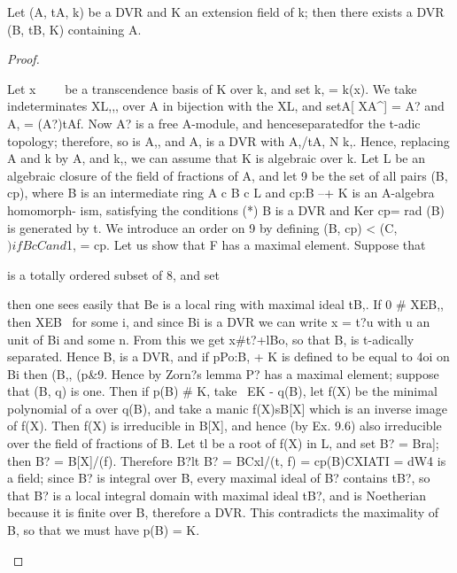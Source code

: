 \begin{theorem}[Theorem 29.1]\label{mcrt-auto-theorem-29-1}\uses{}
\begin{mathematicalrecord}
Let (A, tA, k) be a DVR and K an extension field of k; then
     there exists a DVR (B, tB, K) containing A.
\end{mathematicalrecord}
\end{theorem}
\begin{proof}
\begin{mathematicalrecord}
Let {x~}~~~ be a transcendence basis of K over k, and set k, =
     k({x}). We take indeterminates {XL},,, over A in bijection with the
      {XL}, and setA[ {XA^}] = A? and A, = (A?)tAf. Now A? is a free A-module, and
     henceseparatedfor the t-adic topology; therefore, so is A,, and A, is a DVR
     with A,/tA, N k,. Hence, replacing A and k by A, and k,, we can assume
     that K is algebraic over k. Let L be an algebraic closure of the field of
     fractions of A, and let 9 be the set of all pairs (B, cp), where B is an
intermediate ring A c B c L and cp:B --+ K is an A-algebra homomorph-
ism, satisfying the conditions
    (*) B is a DVR and Ker cp= rad (B) is generated by t.
We introduce an order on 9 by defining (B, cp) < (C, $) if B c C and
$1, = cp. Let us show that F has a maximal element. Suppose that

is a totally ordered subset of 8, and set

then one sees easily that Be is a local ring with maximal ideal tB,. If
0 # XEB,, then XEB~ for some i, and since Bi is a DVR we can write
x = t?u with u an unit of Bi and some n. From this we get x#t?+lBo,        so
that B, is t-adically separated. Hence B, is a DVR, and if pPo:B, + K is
defined to be equal to 4oi on Bi then (B,, (p&9. Hence by Zorn?s lemma
P? has a maximal element; suppose that (B, q) is one. Then if p(B) # K, take
~EK - q(B), let f(X) be the minimal polynomial of a over q(B), and take
a manic f(X)sB[X]       which is an inverse image of f(X). Then f(X) is
irreducible in B[X], and hence (by Ex. 9.6) also irreducible over the field
of fractions of B. Let tl be a root of f(X) in L, and set B? = Bra]; then
B? = B[X]/(f).   Therefore
          B?lt B? = BCxl/(t, f) = cp(B)CXIATI = dW4
is a field; since B? is integral over B, every maximal ideal of B? contains
tB?, so that B? is a local integral domain with maximal ideal tB?, and is
Noetherian because it is finite over B, therefore a DVR. This contradicts
the maximality of B, so that we must have p(B) = K.
\end{mathematicalrecord}
\end{proof}


